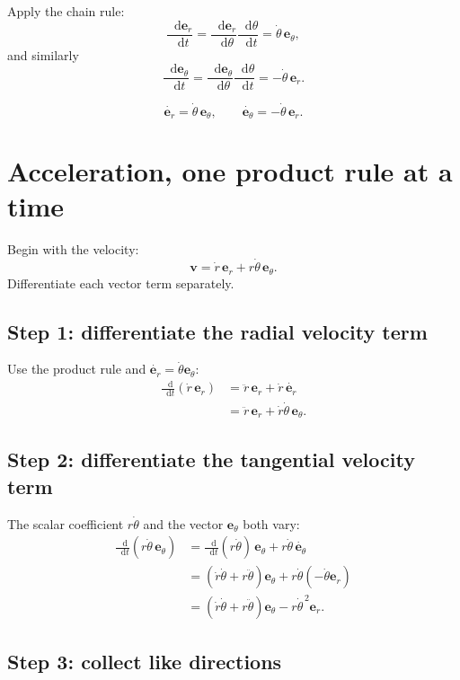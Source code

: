 \documentclass[11pt,a4paper]{article}
\newcommand{\er}{\bm e_r}
\newcommand{\etheta}{\bm e_\theta}
\newcommand{\vv}{\bm v}
\newcommand{\dd}{\mathop{}\!\mathrm d}
\begin{document}
Apply the chain rule:
\[
  \frac{\dd\er}{\dd t}
  =\frac{\dd\er}{\dd\theta}\frac{\dd\theta}{\dd t}
  =\dot\theta\,\etheta,
\]
and similarly
\[
  \frac{\dd\etheta}{\dd t}
  =\frac{\dd\etheta}{\dd\theta}\frac{\dd\theta}{\dd t}
  =-\dot\theta\,\er.
\]

\begin{result}
\[
  \boxed{\dot{\er}=\dot\theta\,\etheta},
  \qquad
  \boxed{\dot{\etheta}=-\dot\theta\,\er}.
\]
\end{result}

\clearpage

\section{Acceleration, one product rule at a time}

Begin with the velocity:
\[
  \vv=\dot r\,\er+r\dot\theta\,\etheta.
\]
Differentiate each vector term separately.

\subsection{Step 1: differentiate the radial velocity term}

Use the product rule and $\dot{\er}=\dot\theta\etheta$:
\begin{align*}
  \frac{\dd}{\dd t}(\dot r\,\er)
  &=\ddot r\,\er+\dot r\,\dot{\er}\\
  &=\ddot r\,\er+\dot r\dot\theta\,\etheta.
\end{align*}

\subsection{Step 2: differentiate the tangential velocity term}

The scalar coefficient $r\dot\theta$ and the vector $\etheta$ both vary:
\begin{align*}
  \frac{\dd}{\dd t}(r\dot\theta\,\etheta)
  &=\frac{\dd}{\dd t}(r\dot\theta)\,\etheta
    +r\dot\theta\,\dot{\etheta}\\
  &=(\dot r\dot\theta+r\ddot\theta)\etheta
    +r\dot\theta(-\dot\theta\er)\\
  &=(\dot r\dot\theta+r\ddot\theta)\etheta
    -r\dot\theta^{\,2}\er.
\end{align*}

\subsection{Step 3: collect like directions}
\end{document}
